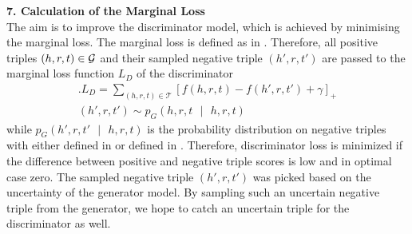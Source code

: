 \textbf{7. Calculation of the Marginal Loss}\\
%
The aim is to improve the discriminator model, which is achieved by minimising the marginal loss.
The marginal loss is defined as in .
Therefore, all positive triples $(h,r,t) \in \mathcal{G}$ and their sampled negative triple $(h',r, t')$  are passed to the marginal loss function $L_D$ of the discriminator
\begin{multline} \label{eq:marginalloss2}.
    L_D =\sum_{(h,r,t) \in \mathcal{T}}[f(h,r,t) - f(h',r,t')+\gamma]_+\\
    (h',r,t') \sim p_G(h,r,t\text{ }|\text{ }h,r,t) 
\end{multline}
while $p_G(h', r, t'\text{ }|\text{ }h, r, t)$ is the probability distribution on negative triples with either \usmax defined in  or \ussoftmax defined in .
Therefore, discriminator loss is minimized if the difference between positive and negative triple scores is low and in optimal case zero.
The sampled negative triple $(h',r,t')$ was picked based on the uncertainty of the generator model.
By sampling such an uncertain negative triple from the generator, we hope to catch an uncertain triple for the discriminator as well.